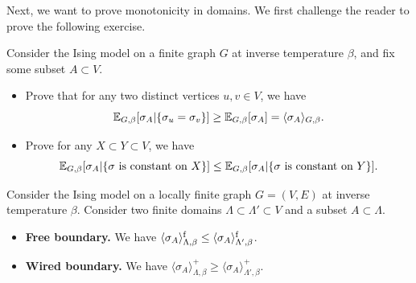 Next, we want to prove monotonicity in domains.
We first challenge the reader to prove the following exercise.

\begin{exercise}
    \label{exo:conditioning_equality}
    Consider the Ising model on a finite graph $G$
    at inverse temperature $\beta$, and fix some subset $A\subset V$.
    \begin{itemize}
        \item     Prove that for any two distinct vertices $u,v\in V$,
            we have
            \[
                \mathbb E_{G,\beta}[\sigma_A|\{\sigma_u=\sigma_v\}]
                \geq
                \mathbb E_{G,\beta}[\sigma_A]=\langle\sigma_A\rangle_{G,\beta}.
            \]
        \item Prove for any $X\subset Y\subset V$, we have
            \[
                \E_{G,\beta}[\sigma_A|\{\text{$\sigma$ is constant on $X$}\}]
                \leq
                \E_{G,\beta}[\sigma_A|\{\text{$\sigma$ is constant on $Y$}\}]
                .
            \]
    \end{itemize}
\end{exercise}

\begin{lemma}
    \label{lemma:correlation_functions_monotone_both}
    Consider the Ising model on a locally finite graph
    $G=(V,E)$ at inverse temperature $\beta$.
    Consider two finite domains $\Lambda\subset\Lambda'\subset V$
    and a subset $A\subset \Lambda$.
    \begin{itemize}
        \item \textbf{Free boundary.}
            We have
            $\langle\sigma_A\rangle^{\operatorname{f}}_{\Lambda,\beta}\leq\langle\sigma_A\rangle^{\operatorname{f}}_{\Lambda',\beta}$.
        \item \textbf{Wired boundary.}
            We have
            $\langle\sigma_A\rangle^+_{\Lambda,\beta}\geq\langle\sigma_A\rangle^+_{\Lambda',\beta}$.
    \end{itemize}
\end{lemma}

